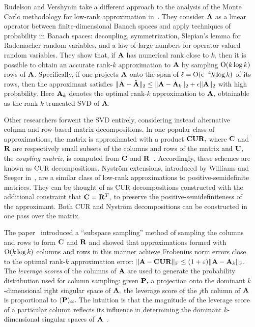 Rudelson and Vershynin take a different approach to the analysis of the Monte
Carlo methodology for low-rank approximation in~\cite{RV07}. They consider $\mathbf{A}$ as a
linear operator between finite-dimensional Banach spaces and apply techniques of
probability in Banach spaces: decoupling, symmetrization, Slepian's lemma for
Rademacher random variables, and a law of large numbers for operator-valued
random variables. They show that, if $\mathbf{A}$ has numerical rank close to $k$,
then it is possible to obtain an accurate rank-$k$ approximation to $\mathbf{A}$ 
by sampling $\mathop{\text{O}}\!\left(k\log k\right)$ rows of $\mathbf{A}$. Specifically, if one 
projects $\mathbf{A}$ onto the span of $\ell = \mathrm{O}(\epsilon^{-4} k \log k)$ of its rows,
then the approximant satisfies $ \|\mathbf{A} - \tilde{\mathbf{A}}\|_2 \leq \|\mathbf{A} - \mathbf{A}_k\|_2 + \epsilon\|\mathbf{A}\|_2$
with high probability. Here $\mathbf{A}_k$ denotes the optimal rank-$k$ approximation to
$\mathbf{A},$ obtainable as the rank-$k$ truncated SVD of $\mathbf{A}.$

Other researchers forwent the SVD entirely, considering instead alternative
column and row-based matrix decompositions. In one popular class of approximations, 
the matrix is approximated with a
product $\mathbf{C}\mathbf{U}\mathbf{R},$ where $\mathbf{C}$ and $\mathbf{R}$ are respectively
small subsets of the columns and rows of the matrix and $\mathbf{U},$ the
\emph{coupling matrix}, is computed from $\mathbf{C}$ and $\mathbf{R}$~\cite{DKM06c}. 
Accordingly, these schemes are known as CUR decompositions. Nystr\"om extensions,
introduced by Williams and Seeger in~\cite{WS01}, are a similar class of
low-rank approximations to positive-semidefinite matrices. They can be thought of
as CUR decompositions constructed with the additional constraint that $\mathbf{C} = \mathbf{R}^T,$
to preserve the positive-semidefiniteness of the approximant. Both CUR and
Nystr\"om decompositions can be constructed in one pass over the matrix.

The paper~\cite{DMM08CUR} 
introduced a ``subspace sampling'' method of sampling the columns and rows to form $\mathbf{C}$ and
$\mathbf{R}$ and showed that approximations formed with $\mathrm{O}(k \log k)$ columns
and rows in this manner achieve Frobenius norm errors close to the optimal 
rank-$k$ approximation error: $\|\mathbf{A} - \mathbf{C} \mathbf{U} \mathbf{R}\|_{\mathrm{F}} \leq (1 + \varepsilon) \|\mathbf{A} - \mathbf{A}_k\|_{\mathrm{F}}.$
The \emph{leverage scores} of the columns of $\mathbf{A}$ are used to generate
the probability distribution used for column sampling: given $\mathbf{P},$ a projection onto
the dominant $k$-dimensional right singular space of $\mathbf{A},$ the leverage score of the
$j$th column of $\mathbf{A}$ is proportional to $(\mathbf{P})_{ii}.$ The intuition is that
the magnitude of the leverage score of a particular column reflects its influence in
determining the dominant $k$-dimensional singular spaces of $\mathbf{A}$~\cite{DM10}.

